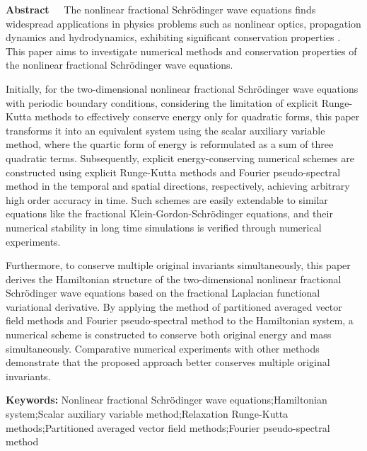 \begin{EnglishAbstract}
\item {\bf Abstract\ \ } 
The nonlinear fractional Schr{\"o}dinger wave equations finds widespread applications in physics problems such as nonlinear optics, propagation dynamics and hydrodynamics, exhibiting significant conservation properties . 
This paper aims to investigate numerical methods and conservation properties of the nonlinear fractional Schr{\"o}dinger wave equations. 

Initially, for the two-dimensional nonlinear fractional Schr{\"o}dinger wave equations with periodic boundary conditions, considering the limitation of explicit Runge-Kutta methods to effectively conserve energy only for quadratic forms, this paper transforms it into an equivalent system using the scalar auxiliary variable method, where the quartic form of energy is reformulated as a sum of three quadratic terms. 
Subsequently, explicit energy-conserving numerical schemes are constructed using explicit Runge-Kutta methods and Fourier pseudo-spectral method in the temporal and spatial directions, respectively, achieving arbitrary high order accuracy in time. 
Such schemes are easily extendable to similar equations like the fractional Klein-Gordon-Schr{\"o}dinger equations, and their numerical stability in long time simulations is verified through numerical experiments. 

Furthermore, to conserve multiple original invariants simultaneously, this paper derives the Hamiltonian structure of the two-dimensional nonlinear fractional Schr{\"o}dinger wave equations based on the fractional Laplacian functional variational derivative. 
By applying the method of partitioned averaged vector field methods and Fourier pseudo-spectral method to the Hamiltonian system, a numerical scheme is constructed to conserve both original energy and mass simultaneously. 
Comparative numerical experiments with other methods demonstrate that the proposed approach better conserves multiple original invariants. 


\item {\bf Keywords:} Nonlinear fractional Schr{\"o}dinger wave equations;\quad Hamiltonian system;\quad Scalar auxiliary variable method;\quad Relaxation Runge-Kutta methods;\quad Partitioned averaged vector field methods;\quad Fourier pseudo-spectral method
\end{EnglishAbstract}